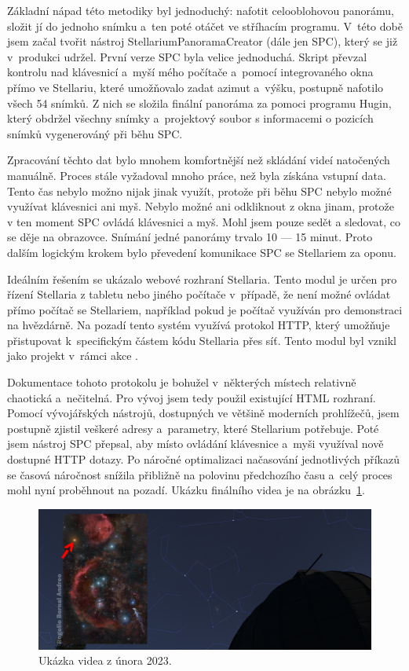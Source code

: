 \documentclass[12pt,a4paper,titlepage]{article}
\begin{document}
Základní nápad této metodiky byl jednoduchý: nafotit celooblohovou panorámu, složit jí do jednoho snímku a~ten poté otáčet ve stříhacím programu. V~této době jsem začal tvořit nástroj StellariumPanoramaCreator (dále jen SPC), který se již v~produkci udržel. První verze SPC byla velice jednoduchá. Skript převzal kontrolu nad klávesnicí a~myší mého počítače a~pomocí integrovaného okna přímo ve Stellariu, které umožňovalo zadat azimut a~výšku, postupně nafotilo všech 54 snímků. Z nich se složila finální panoráma za pomoci programu Hugin, který obdržel všechny snímky a~projektový soubor s informacemi o pozicích snímků vygenerováný při běhu SPC.\@

Zpracování těchto dat bylo mnohem komfortnější než skládání videí natočených manuálně. Proces stále vyžadoval mnoho práce, než byla získána vstupní data. Tento čas nebylo možno nijak jinak využít, protože při běhu SPC nebylo možné využívat klávesnici ani myš. Nebylo možné ani odkliknout z okna jinam, protože v ten moment SPC ovládá klávesnici a myš. Mohl jsem pouze sedět a sledovat, co se děje na obrazovce. Snímání jedné panorámy trvalo 10 --- 15 minut. Proto dalším logickým krokem bylo převedení komunikace SPC se Stellariem za oponu. 

Ideálním řešením se ukázalo webové rozhraní Stellaria. Tento modul je určen pro řízení Stellaria z tabletu nebo jiného počítače v~případě, že není možné ovládat přímo počítač se Stellariem, například pokud je počítač využíván pro demonstraci na hvězdárně. Na pozadí tento systém využívá protokol HTTP, který umožňuje přistupovat k~specifickým částem kódu Stellaria přes síť. Tento modul byl vznikl jako projekt v~rámci akce . 

Dokumentace tohoto protokolu je bohužel v~některých místech relativně chaotická a~nečitelná. Pro vývoj jsem tedy použil existující HTML rozhraní. Pomocí vývojářských nástrojů, dostupných ve většině moderních prohlížečů, jsem postupně zjistil veškeré adresy a~parametry, které Stellarium potřebuje. Poté jsem nástroj SPC přepsal, aby místo ovládání klávesnice a~myši využíval nově dostupné HTTP dotazy. Po náročné optimalizaci načasování jednotlivých příkazů se časová náročnost snížila přibližně na polovinu předchozího času a~celý proces mohl nyní proběhnout na pozadí. Ukázku finálního videa je na obrázku~\ref{img:unor}.

\begin{figure}[ht]
	\centering
	\includegraphics[width=.85\textwidth]{unor.png}
	\caption{Ukázka videa z února 2023.}\label{img:unor}
\end{figure}
\end{document}
